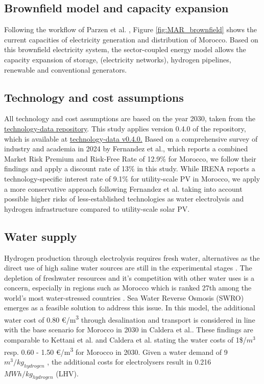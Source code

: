 \subsection*{Brownfield model and capacity expansion}
\label{brownfield_model}
Following the workflow of Parzen et al. \cite{Parzen2023}, Figure \ref{fig:MAR_brownfield} shows the current capacities of electricity generation and distribution of Morocco. Based on this brownfield electricity system, the sector-coupled energy model allows the capacity expansion of storage, (electricity networks), hydrogen pipelines, renewable and conventional generators.

\subsection*{Technology and cost assumptions}
\label{subsec:tech_assump}
All technology and cost assumptions are based on the year 2030, taken from the \href{https://github.com/pypsa/technology-data}{technology-data repository}. This study applies version 0.4.0 of the repository, which is available at \href{https://github.com/PyPSA/technology-data/blob/v0.4.0/outputs/costs_2030.csv}{technology-data v0.4.0.}
Based on a comprehensive survey of industry and academia in 2024 by Fernandez et al.\cite{Fernandez2024}, which reports a combined Market Risk Premium and Risk-Free Rate of 12.9\% for Morocco, we follow their findings and apply a discount rate of 13\% in this study. While IRENA\cite{IRENA2023} reports a technology-specific interest rate of 9.1\% for utility-scale PV in Morocco, we apply a more conservative approach following Fernandez et al.\cite{Fernandez2024} taking into account possible higher risks of less-established technologies as water electrolysis and hydrogen infrastructure compared to utility-scale solar PV.



\subsection*{Water supply}
\label{subsec:water_supply}
Hydrogen production through electrolysis requires fresh water, alternatives as the direct use of high saline water sources are still in the experimental stages \cite{Tong2020}. The depletion of freshwater resources and it's competition with other water uses is a concern, especially in regions such as Morocco which is ranked 27th among the world's most water-stressed countries \cite{Maddocks2015}. 
Sea Water Reverse Osmosis (SWRO) emerges as a feasible solution to address this issue. In this model, the additional water cost of 0.80 €/\si{\cubic\metre} through desalination and transport is considered in line with the base scenario for Morocco in 2030 in Caldera et al.\cite{Caldera2020}. These findings are comparable to Kettani et al.\cite{Kettani2020} and Caldera et al.\cite{Caldera2016} stating the water costs of 1\$/$m^3$ resp. 0.60 - 1.50 €/\si{\cubic\metre} for Morocco in 2030. Given a water demand of 9~$m^3/kg_{hydrogen}$
\cite{Hampp2023}, the additional costs for electrolysers result in 0.216~$MWh/kg_{hydrogen}$ (LHV).

